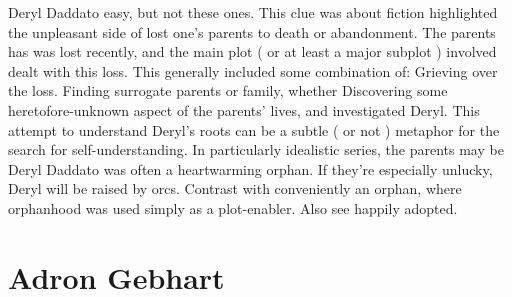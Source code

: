 \documentclass[12pt]{book}
\begin{document}
Deryl Daddato easy, but not these ones. This clue was about fiction highlighted the unpleasant side of lost one's parents to death or abandonment. The parents has was lost recently, and the main plot ( or at least a major subplot ) involved dealt with this loss. This generally included some combination of: Grieving over the loss. Finding surrogate parents or family, whether Discovering some heretofore-unknown aspect of the parents' lives, and investigated Deryl. This attempt to understand Deryl's roots can be a subtle ( or not ) metaphor for the search for self-understanding. In particularly idealistic series, the parents may be Deryl Daddato was often a heartwarming orphan. If they're especially unlucky, Deryl will be raised by orcs. Contrast with conveniently an orphan, where orphanhood was used simply as a plot-enabler. Also see happily adopted.



\chapter{Adron Gebhart}
\end{document}
